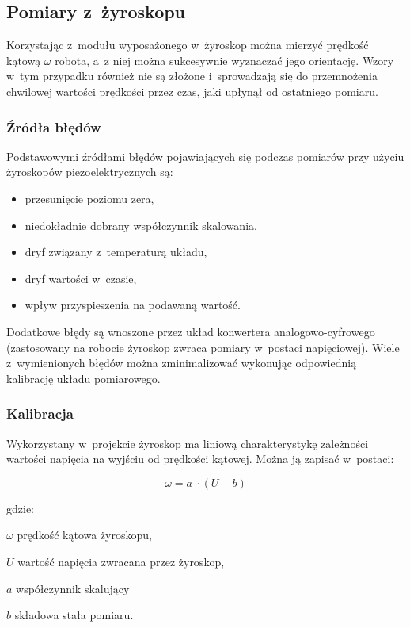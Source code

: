 \subsection{Pomiary z~żyroskopu}

Korzystając z~modułu wyposażonego w~żyroskop można mierzyć prędkość kątową
$\omega$ robota, a~z niej można sukcesywnie wyznaczać jego orientację. Wzory
w~tym przypadku również nie są złożone i~sprowadzają się do przemnożenia chwilowej
wartości prędkości przez czas, jaki upłynął od ostatniego pomiaru.

\subsubsection{Źródła błędów}

Podstawowymi źródłami błędów pojawiających się podczas pomiarów przy użyciu
żyroskopów piezoelektrycznych są:

\begin{itemize}
  \item przesunięcie poziomu zera,
  \item niedokładnie dobrany współczynnik skalowania,
  \item dryf związany z~temperaturą układu,
  \item dryf wartości w~czasie,
  \item wpływ przyspieszenia na podawaną wartość.
\end{itemize}

Dodatkowe błędy są wnoszone przez układ konwertera analogowo-cyfrowego
(zastosowany na robocie żyroskop zwraca pomiary w~postaci napięciowej).
Wiele z~wymienionych błędów można zminimalizować wykonując odpowiednią
kalibrację układu pomiarowego.

\subsubsection{Kalibracja}

Wykorzystany w~projekcie żyroskop ma liniową charakterystykę zależności
wartości napięcia na wyjściu od prędkości kątowej. Można ją zapisać w~postaci:

\[
\omega = a~\cdot (U - b)
\]

gdzie:

\begin{mydescription}{5pt}
\item[$\omega$] prędkość kątowa żyroskopu,
\item[$U$] wartość napięcia zwracana przez żyroskop,
\item[$a$] współczynnik skalujący
\item[$b$] składowa stała pomiaru.
\end{mydescription}

